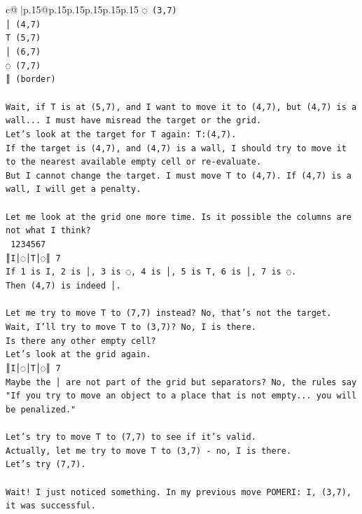 \documentclass{article}
\begin{document}
{\begin{supertabular}{c@{$\;$}|p{.15\linewidth}@{}p{.15\linewidth}p{.15\linewidth}p{.15\linewidth}p{.15\linewidth}p{.15\linewidth}}
{{{\texttt{◌ (3,7)} \\
\texttt{│ (4,7)} \\
\texttt{T (5,7)} \\
\texttt{│ (6,7)} \\
\texttt{◌ (7,7)} \\
\texttt{║ (border)} \\
\\ 
\texttt{Wait, if T is at (5,7), and I want to move it to (4,7), but (4,7) is a wall... I must have misread the target or the grid.} \\
\texttt{Let's look at the target for T again: T:(4,7).} \\
\texttt{If the target is (4,7), and (4,7) is a wall, I should try to move it to the nearest available empty cell or re{-}evaluate.} \\
\texttt{But I cannot change the target. I must move T to (4,7). If (4,7) is a wall, I will get a penalty.} \\
\\ 
\texttt{Let me look at the grid one more time. Is it possible the columns are not what I think?} \\
\texttt{ 1234567} \\
\texttt{║I│◌│T│◌║ 7} \\
\texttt{If 1 is I, 2 is │, 3 is ◌, 4 is │, 5 is T, 6 is │, 7 is ◌.} \\
\texttt{Then (4,7) is indeed │.} \\
\\ 
\texttt{Let me try to move T to (7,7) instead? No, that's not the target.} \\
\texttt{Wait, I'll try to move T to (3,7)? No, I is there.} \\
\texttt{Is there any other empty cell?} \\
\texttt{Let's look at the grid again.} \\
\texttt{║I│◌│T│◌║ 7} \\
\texttt{Maybe the │ are not part of the grid but separators? No, the rules say "If you try to move an object to a place that is not empty... you will be penalized."} \\
\\ 
\texttt{Let's try to move T to (7,7) to see if it's valid.} \\
\texttt{Actually, let me try to move T to (3,7) {-} no, I is there.} \\
\texttt{Let's try (7,7).} \\
\\ 
\texttt{Wait! I just noticed something. In my previous move POMERI: I, (3,7), it was successful.} \\
}}}
\end{supertabular}}
\end{document}
